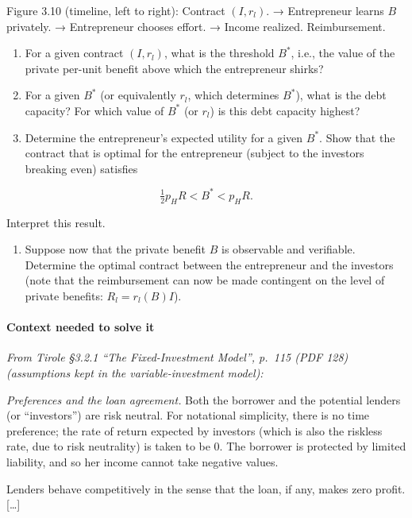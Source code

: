 \documentclass[11pt,a4paper]{article}
\providecommand{\tightlist}{\setlength{\itemsep}{0pt}\setlength{\parskip}{0pt}}
\begin{document}
Figure 3.10 (timeline, left to right): Contract \((I, r_l)\). → Entrepreneur learns \(B\) privately.
→ Entrepreneur chooses effort. → Income realized. Reimbursement.

\begin{enumerate}
\def\labelenumi{(\roman{enumi})}
\item
  For a given contract \((I, r_l)\), what is the threshold \(B^*\), i.e., the value of the private
  per-unit benefit above which the entrepreneur shirks?
\item
  For a given \(B^*\) (or equivalently \(r_l\), which determines \(B^*\)), what is the debt
  capacity? For which value of \(B^*\) (or \(r_l\)) is this debt capacity highest?
\item
  Determine the entrepreneur's expected utility for a given \(B^*\). Show that the contract that is
  optimal for the entrepreneur (subject to the investors breaking even) satisfies
\end{enumerate}

\[\tfrac{1}{2} p_H R < B^* < p_H R.\]

Interpret this result.

\begin{enumerate}
\def\labelenumi{(\roman{enumi})}
\setcounter{enumi}{3}
\tightlist
\item
  Suppose now that the private benefit \(B\) is observable and verifiable. Determine the optimal
  contract between the entrepreneur and the investors (note that the reimbursement can now be made
  contingent on the level of private benefits: \(R_l = r_l(B) I\)).
\end{enumerate}

\paragraph{Context needed to solve it}

\emph{From Tirole §3.2.1 ``The Fixed-Investment Model'', p.~115 (PDF 128) (assumptions kept in the
variable-investment model):}

\emph{Preferences and the loan agreement.} Both the borrower and the potential lenders (or
``investors'') are risk neutral. For notational simplicity, there is no time preference; the rate of
return expected by investors (which is also the riskless rate, due to risk neutrality) is taken to
be 0. The borrower is protected by limited liability, and so her income cannot take negative values.

Lenders behave competitively in the sense that the loan, if any, makes zero profit. {[}\ldots{]}
\end{document}
